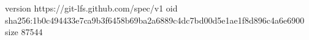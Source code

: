 version https://git-lfs.github.com/spec/v1
oid sha256:1b0c494433e7ca9b3f6458b69ba2a6889c4dc7bd00d5e1ae1f8d896c4a6e6900
size 87544

